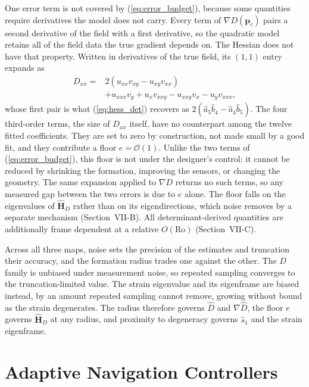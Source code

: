\documentclass[lettersize,journal]{IEEEtran}
\begin{document}
One error term is not covered by (\ref{eq:error_budget}), because some
quantities require derivatives the model does not carry. Every term of
$\nabla D(\mathbf{p}_c)$ pairs a second derivative of the field with a
first derivative, so the quadratic model retains all of the field data
the true gradient depends on. The Hessian does not have that property.
Written in derivatives of the true field, its $(1,1)$ entry expands as
\begin{equation}
\begin{split}
    D_{xx} = {}&2(u_{xx} v_{xy} - u_{xy} v_{xx}) \\
        &+ u_{xxx} v_y + u_x v_{xxy}
        - u_{xxy} v_x - u_y v_{xxx},
\end{split}
    \label{eq:Dxx_true}
\end{equation}
whose first pair is what (\ref{eq:hess_det}) recovers as $2(\hat{a}_5
\hat{b}_4 - \hat{a}_4 \hat{b}_5)$. The four third-order terms, the size
of $D_{xx}$ itself, have no counterpart among the twelve fitted
coefficients. They are set to zero by construction, not made small by a
good fit, and they
contribute a floor $e = \mathcal{O}(1)$. Unlike the two terms of
(\ref{eq:error_budget}), this floor is not under the designer's control:
it cannot be reduced by shrinking the formation, improving the sensors,
or changing the geometry. The same expansion
applied to $\nabla D$ returns no such terms, so any measured gap between
the two errors is due to $e$ alone. The floor falls on the eigenvalues
of $\hat{\mathbf{H}}_D$ rather than on its eigendirections, which noise
removes by a separate mechanism (Section~\mbox{VII-B}). All
determinant-derived quantities are additionally frame dependent at a
relative $O(\mathrm{Ro})$ (Section~\mbox{VII-C}).

Across all three maps, noise sets the precision of the estimates and
truncation their accuracy, and the formation radius trades one against
the other. The $D$ family is unbiased under measurement noise,
so repeated sampling converges to the truncation-limited value. The
strain eigenvalue and its eigenframe are biased instead, by an amount
repeated sampling cannot remove, growing without bound as the strain
degenerates. The radius therefore governs $\hat{D}$ and
$\nabla\hat{D}$, the floor $e$ governs $\hat{\mathbf{H}}_D$ at any
radius, and proximity to degeneracy governs $\hat{s}_1$ and the strain
eigenframe.

\section{Adaptive Navigation Controllers}
\label{sec:controllers}
\end{document}
